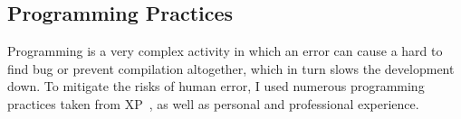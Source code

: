 \subsection{Programming Practices}\label{sec:programming-practices}

Programming is a very complex activity
in which an error can cause a hard to find bug
or prevent compilation altogether,
which in turn slows the development down.
To mitigate the risks of human error,
I used numerous programming practices
taken from \ac{XP}~\cite{beck_extreme_2004},
as well as personal and professional experience.







